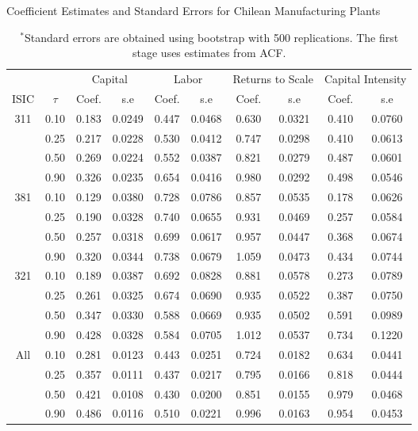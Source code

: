 \documentclass[12pt]{article}
\begin{document}
\begin{table}[H]
\centering
\caption{Coefficient Estimates and Standard Errors for Chilean Manufacturing Plants}
\small
\begin{tabular}{cccccccccc}
  \hline\hline & & \multicolumn{2}{c}{Capital}  & \multicolumn{2}{c}{Labor} & \multicolumn{2}{c}{Returns to Scale} & \multicolumn{2}{c}{Capital Intensity}\\ \cmidrule(lr){3-4} \cmidrule(lr){5-6} \cmidrule(lr){7-8} \cmidrule(lr){9-10}ISIC & $\tau$ & Coef. & s.e & Coef. & s.e & Coef. & s.e & Coef. & s.e \\ 
  \hline
311 & 0.10 & 0.183 & 0.0249 & 0.447 & 0.0468 & 0.630 & 0.0321 & 0.410 & 0.0760 \\ 
   & 0.25 & 0.217 & 0.0228 & 0.530 & 0.0412 & 0.747 & 0.0298 & 0.410 & 0.0613 \\ 
   & 0.50 & 0.269 & 0.0224 & 0.552 & 0.0387 & 0.821 & 0.0279 & 0.487 & 0.0601 \\ 
   & 0.90 & 0.326 & 0.0235 & 0.654 & 0.0416 & 0.980 & 0.0292 & 0.498 & 0.0546 \\ 
  381 & 0.10 & 0.129 & 0.0380 & 0.728 & 0.0786 & 0.857 & 0.0535 & 0.178 & 0.0626 \\ 
   & 0.25 & 0.190 & 0.0328 & 0.740 & 0.0655 & 0.931 & 0.0469 & 0.257 & 0.0584 \\ 
   & 0.50 & 0.257 & 0.0318 & 0.699 & 0.0617 & 0.957 & 0.0447 & 0.368 & 0.0674 \\ 
   & 0.90 & 0.320 & 0.0344 & 0.738 & 0.0679 & 1.059 & 0.0473 & 0.434 & 0.0744 \\ 
  321 & 0.10 & 0.189 & 0.0387 & 0.692 & 0.0828 & 0.881 & 0.0578 & 0.273 & 0.0789 \\ 
   & 0.25 & 0.261 & 0.0325 & 0.674 & 0.0690 & 0.935 & 0.0522 & 0.387 & 0.0750 \\ 
   & 0.50 & 0.347 & 0.0330 & 0.588 & 0.0669 & 0.935 & 0.0502 & 0.591 & 0.0989 \\ 
   & 0.90 & 0.428 & 0.0328 & 0.584 & 0.0705 & 1.012 & 0.0537 & 0.734 & 0.1220 \\ 
  All & 0.10 & 0.281 & 0.0123 & 0.443 & 0.0251 & 0.724 & 0.0182 & 0.634 & 0.0441 \\ 
   & 0.25 & 0.357 & 0.0111 & 0.437 & 0.0217 & 0.795 & 0.0166 & 0.818 & 0.0444 \\ 
   & 0.50 & 0.421 & 0.0108 & 0.430 & 0.0200 & 0.851 & 0.0155 & 0.979 & 0.0468 \\ 
   & 0.90 & 0.486 & 0.0116 & 0.510 & 0.0221 & 0.996 & 0.0163 & 0.954 & 0.0453 \\ 
   \hline
\end{tabular}
\caption*{\footnotesize $^{*}$Standard errors are obtained using bootstrap with 500 replications. The first stage uses estimates from ACF.}
\label{CHLQACF}
\end{table}
\end{document}
